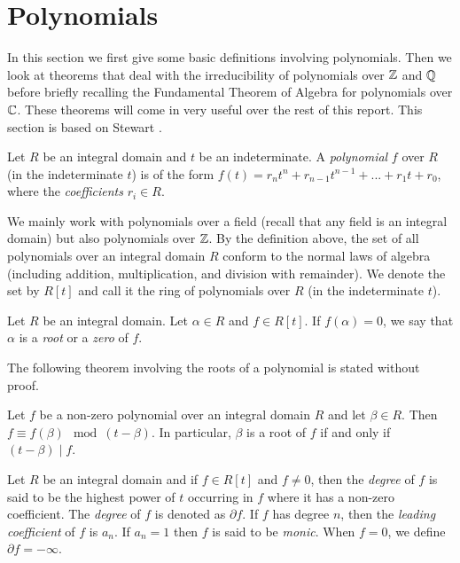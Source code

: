 

\section{Polynomials} \label{sec:poly}
In this section we first give some basic definitions involving polynomials. Then we look at theorems that deal with the irreducibility of polynomials over $\mathbb Z$ and $\mathbb Q$ before briefly recalling the Fundamental Theorem of Algebra for polynomials over $\mathbb C$. These theorems will come in very useful over the rest of this report. This section is based on Stewart \cite[Chapters~2-3]{Stewart}. 

\begin{definition}
    Let $R$ be an integral domain and $t$ be an indeterminate. A \textit{polynomial} $f$ over $R$ (in the indeterminate $t$) is of the form $f(t) = r_n t^n + r_{n-1} t^{n-1} + ... + r_1 t + r_0$, where the \textit{coefficients} $r_i \in R$. 
\end{definition}

We mainly work with polynomials over a field (recall that any field is an integral domain) but also polynomials over $\mathbb Z$. By the definition above, the set of all polynomials over an integral domain $R$ conform to  the normal laws of algebra (including addition, multiplication, and division with remainder). We denote the set by $R[t]$ and call it the ring of polynomials over $R$ (in the indeterminate $t$). 

\begin{definition}
	Let $R$ be an integral domain. Let $\alpha \in R$ and $f \in R[t]$. If $f(\alpha) = 0$, we say that $\alpha$ is a \textit{root} or a \textit{zero} of $f$. 
\end{definition}

The following theorem involving the roots of a polynomial is stated without proof.

\begin{theorem} \label{thm:remainder}
	Let $f$ be a non-zero polynomial over an integral domain $R$ and let $\beta \in R$. Then $f \equiv f(\beta) \mod (t - \beta)$. 
	In particular, $\beta$ is a root of $f$ if and only if $(t - \beta) \mid f$. 
\end{theorem}


\begin{definition}
    Let $R$ be an integral domain and if $f \in R[t]$ and $f \neq 0$, then the \textit{degree} of $f$ is said to be the highest power of $t$ occurring in $f$ where it has a non-zero coefficient. The \textit{degree} of $f$ is denoted as $\partial f$. If $f$ has degree $n$, then the \textit{leading coefficient} of $f$ is $a_n$. If $a_n = 1$ then $f$ is said to be \textit{monic}. When $f = 0$, we define $\partial f = - \infty$.
\end{definition}


